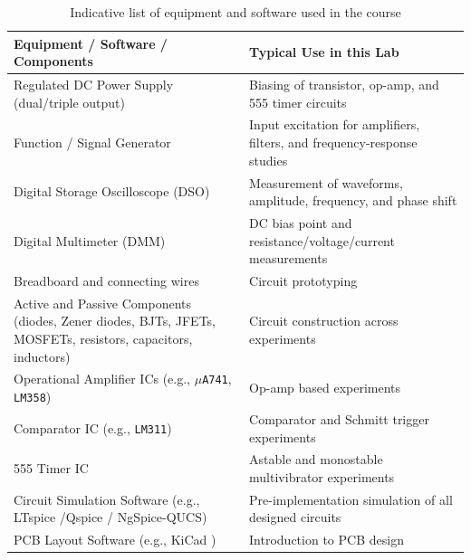 \begin{table}[H]
	\centering
	\renewcommand{\arraystretch}{1.4}
	\begin{tabular}{|p{6.5cm}|p{8.5cm}|}
		\hline
		\textbf{Equipment / Software / Components} & \textbf{Typical Use in this Lab} \\
		\hline
		Regulated DC Power Supply (dual/triple output) & Biasing of transistor, op-amp, and 555 timer circuits \\
		\hline
		Function / Signal Generator & Input excitation for amplifiers, filters, and frequency-response studies \\
		\hline
		Digital Storage Oscilloscope (DSO) & Measurement of waveforms, amplitude, frequency, and phase shift \\
		\hline
		Digital Multimeter (DMM) & DC bias point and resistance/voltage/current measurements \\
		\hline
		Breadboard and connecting wires & Circuit prototyping \\
		\hline
		Active and Passive Components (diodes, Zener diodes, BJTs, JFETs, MOSFETs, resistors, capacitors, inductors) & Circuit construction across experiments \\
		\hline
		Operational Amplifier ICs (e.g., \texttt{$\mu$A741}, \texttt{LM358}) & Op-amp based experiments \\
		\hline
		Comparator IC (e.g., \texttt{LM311}) & Comparator and Schmitt trigger experiments \\
		\hline
		555 Timer IC & Astable and monostable multivibrator experiments \\
		\hline
		Circuit Simulation Software (e.g., LTspice /Qspice / NgSpice-QUCS) & Pre-implementation simulation of all designed circuits \\
		\hline
		PCB Layout Software (e.g., KiCad ) & Introduction to PCB design \\
		\hline
	\end{tabular}
	\caption{Indicative list of equipment and software used in the course}
\end{table}
